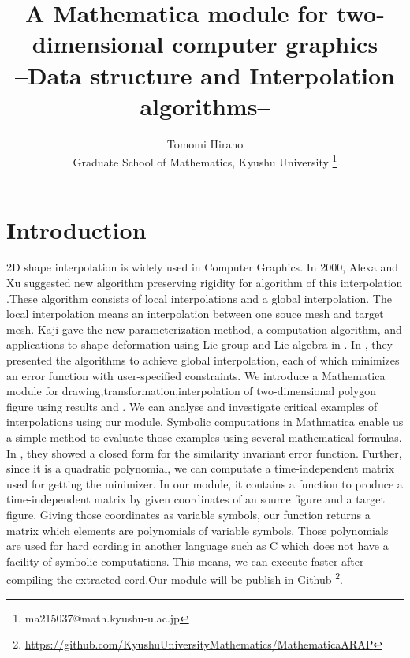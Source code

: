 \documentclass[8pt]{article}
\title{A Mathematica module for two-dimensional computer graphics\\
--Data structure and Interpolation algorithms--
}
\author{Tomomi Hirano\\
Graduate School of Mathematics, Kyushu University
\footnote{ma215037@math.kyushu-u.ac.jp}
}
\begin{document}
\maketitle
\section{Introduction}
2D shape interpolation is widely used in Computer Graphics.
In 2000, Alexa and Xu suggested new algorithm preserving rigidity for algorithm of this interpolation \cite{Alexa2000} .These algorithm consists of local interpolations and a global interpolation.
The local interpolation means an interpolation between one souce mesh and target mesh. 
Kaji gave the new parameterization method, a computation algorithm, and applications to shape deformation  using Lie group and Lie algebra in \cite{Kaji2012}.
In \cite{Kaji2013}, they presented the algorithms to achieve global interpolation, each of which minimizes an error function with user-specified constraints. 
We introduce a Mathematica module for drawing,transformation,interpolation of two-dimensional polygon figure using results \cite{Alexa2000}  and  \cite{Kaji2012}.
We can analyse and investigate critical examples of interpolations using our module.
Symbolic computations in Mathmatica enable us a simple method to evaluate those examples
using several mathematical formulas.
In  \cite{Kaji2012}, they showed a closed form for the similarity invariant error function.
Further, since it is a quadratic polynomial, we can computate a time-independent
matrix used for getting the minimizer.
In our module, it contains a function to produce a time-independent matrix
by given coordinates of an source figure and a target figure.
Giving those coordinates as variable symbols, our function returns a matrix
which elements are polynomials of variable symbols.
Those polynomials are used for hard cording in another language
such as C which does not have a facility of symbolic computations.
This means, we can execute faster after compiling the extracted cord.Our module will be publish in Github \footnote{\url{https://github.com/KyushuUniversityMathematics/MathematicaARAP}}.
\end{document}
